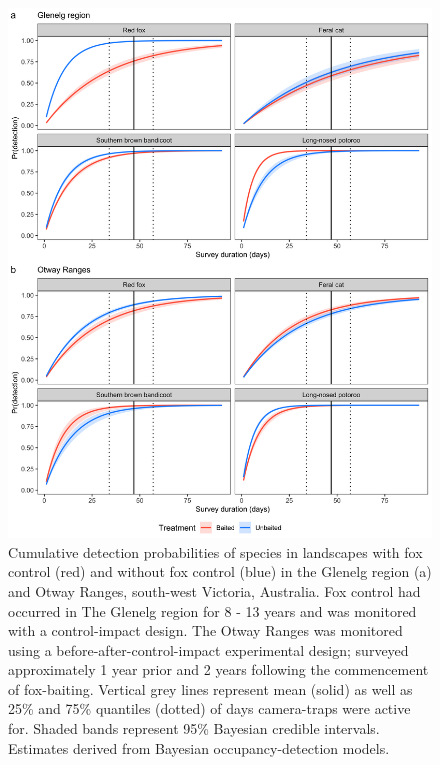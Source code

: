 \documentclass[]{elsarticle} %
\begin{document}
\begin{figure}

{\centering \includegraphics[width=0.8\linewidth]{../figs/detectability} 

}

\caption{Cumulative detection probabilities of species in landscapes with fox control (red) and without fox control (blue) in the Glenelg region (a) and Otway Ranges, south-west Victoria, Australia. Fox control had occurred in The Glenelg region for 8 - 13 years and was monitored with a control-impact design. The Otway Ranges was monitored using a before-after-control-impact experimental design; surveyed approximately 1 year prior and 2 years following the commencement of fox-baiting. Vertical grey lines represent mean (solid) as well as 25\% and 75\% quantiles (dotted) of days camera-traps were active for. Shaded bands represent 95\% Bayesian credible intervals. Estimates derived from Bayesian occupancy-detection models.}\label{fig:occ-cumdet}
\end{figure}

\newpage

\begingroup\fontsize{10}{12}\selectfont
\end{document}
